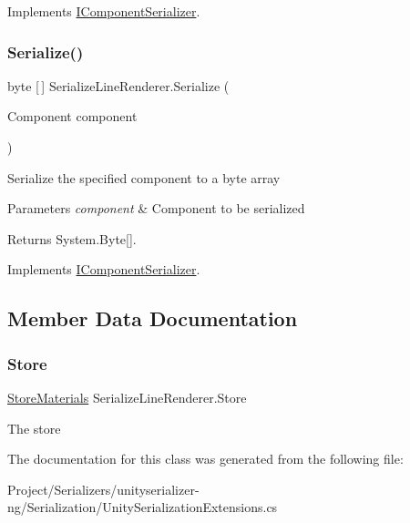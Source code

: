 Implements \hyperlink{interface_i_component_serializer_a4cc366a5c78b33d47a90c209d8fed883}{I\+Component\+Serializer}.

\mbox{\label{class_serialize_line_renderer_a2e58af3caf73c033912f59f8a568f6e4}} 
\subsubsection{\texorpdfstring{Serialize()}{Serialize()}}
{\footnotesize\ttfamily byte \mbox{[}$\,$\mbox{]} Serialize\+Line\+Renderer.\+Serialize (\begin{DoxyParamCaption}\item[{Component}]{component }\end{DoxyParamCaption})\hspace{0.3cm}{\ttfamily [inline]}}



Serialize the specified component to a byte array 


\begin{DoxyParams}{Parameters}
{\em component} & Component to be serialized\\
\hline
\end{DoxyParams}
\begin{DoxyReturn}{Returns}
System.\+Byte\mbox{[}\mbox{]}.
\end{DoxyReturn}


Implements \hyperlink{interface_i_component_serializer_ab2aa38005665496b62d6c54b5f0dbd31}{I\+Component\+Serializer}.



\subsection{Member Data Documentation}
\mbox{\label{class_serialize_line_renderer_a77fab02d27de2b02dedda9798e2b6170}} 
\subsubsection{\texorpdfstring{Store}{Store}}
{\footnotesize\ttfamily \hyperlink{class_serialization_1_1_store_materials}{Store\+Materials} Serialize\+Line\+Renderer.\+Store\hspace{0.3cm}{\ttfamily [static]}}



The store 



The documentation for this class was generated from the following file\+:\begin{DoxyCompactItemize}
\item 
Project/\+Serializers/unityserializer-\/ng/\+Serialization/Unity\+Serialization\+Extensions.\+cs\end{DoxyCompactItemize}
